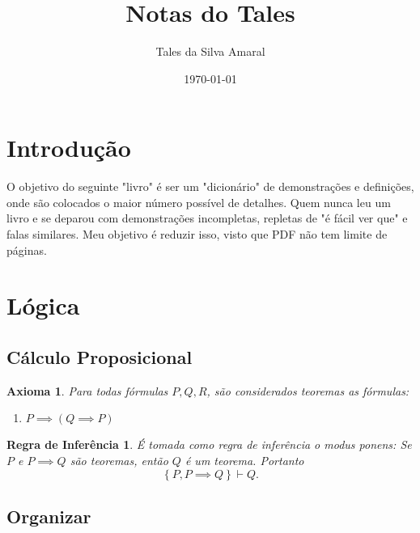 \documentclass{article}
\title{Notas do Tales}
\author{Tales da Silva Amaral}
\date{\today}
\theoremstyle{plain}
\newtheorem{axioma}{Axioma}
\newtheorem{inferencia}{Regra de Inferência}
\theoremstyle{definition}
\theoremstyle{remark}
\begin{document}
\maketitle
\newpage
\tableofcontents
\newpage

\section{Introdução}

O objetivo do seguinte "livro" é ser um "dicionário" de demonstrações e definições, onde são colocados o maior número possível de detalhes. Quem nunca leu um livro e se deparou com demonstrações incompletas, repletas de "é fácil ver que" e falas similares. Meu objetivo é reduzir isso, visto que PDF não tem limite de páginas.

\doclicenseThis

\section{Lógica}
\subsection{Cálculo Proposicional}
\begin{axioma}
	Para todas fórmulas $P, Q, R$, são  considerados teoremas as fórmulas:
	\begin{enumerate}
		\item $P\implies (Q\implies P)$
	\end{enumerate}
\end{axioma}
\begin{inferencia}
	É tomada como regra de inferência o modus ponens:
	Se $P$ e $P\implies Q$ são teoremas, então $Q$ é um teorema. Portanto $$ \left\{ P, P\implies Q \right\} \vdash Q.$$ 
\end{inferencia}
\subsection{Organizar}
\end{document}
